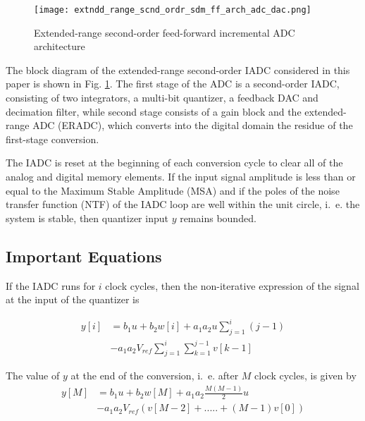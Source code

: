 \begin{figure}
    \centering
    \texttt{[image: extndd\_range\_scnd\_ordr\_sdm\_ff\_arch\_adc\_dac.png]}
    \caption{Extended-range second-order feed-forward incremental ADC architecture}
    \label{ERISDM_MFF}
\end{figure}

The block diagram of the extended-range second-order IADC considered in this paper is shown in Fig. \ref{ERISDM_MFF}. The first stage of the ADC is a second-order IADC, consisting of two integrators, a multi-bit quantizer, a feedback DAC and decimation filter, while second stage consists of a gain block and the extended-range ADC (ERADC), which converts into the digital domain the residue of the first-stage conversion.

The IADC is reset at the beginning of each conversion cycle to clear all of the analog and digital memory elements. If the input signal amplitude is less than or equal to the Maximum Stable Amplitude (MSA) and if the poles of the noise transfer function (NTF) of the IADC loop are well within the unit circle, i.~e. the system is stable, then quantizer input $y$ remains bounded.

\subsection{Important Equations}

If the IADC runs for $i$ clock cycles, then the non-iterative expression of the signal at the input of the quantizer is

\begin{equation}
\begin{split}
    y[i]&=b_1u+b_2w[i]+a_1a_2u\sum_{j=1}^{i} (j-1)\\
        &-a_1a_2V_{ref}\sum_{j=1}^{i}\sum_{k=1}^{j-1} v[k-1]
\end{split}
\end{equation}

The value of $y$ at the end of the conversion, i.~e. after $M$ clock cycles, is given by
\begin{equation}
    \begin{split}
        y[M]&=b_1u+b_2w[M]+a_1a_2\frac{M(M-1)}{2}u\\
            &-a_1a_2V_{ref}\left(v[M-2]+.....+(M-1)v[0]\right)
    \end{split}
\end{equation}

